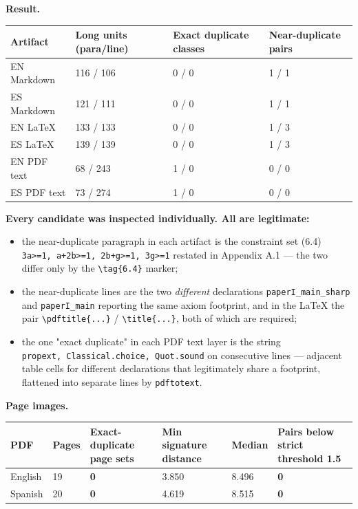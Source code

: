 \documentclass[
  9pt,
  a4paper,
]{article}
\newcounter{none} %
\providecommand{\tightlist}{%
  \setlength{\itemsep}{0pt}\setlength{\parskip}{0pt}}
\begin{document}
\textbf{Result.}

{\def\LTcaptype{none} %
\begin{longtable}[]{@{}llll@{}}
\toprule\noalign{}
Artifact & Long units (para/line) & Exact duplicate classes &
Near-duplicate pairs \\
\midrule\noalign{}
\endhead
\bottomrule\noalign{}
\endlastfoot
EN Markdown & 116 / 106 & 0 / 0 & 1 / 1 \\
ES Markdown & 121 / 111 & 0 / 0 & 1 / 1 \\
EN LaTeX & 133 / 133 & 0 / 0 & 1 / 3 \\
ES LaTeX & 139 / 139 & 0 / 0 & 1 / 3 \\
EN PDF text & 68 / 243 & 1 / 0 & 0 / 0 \\
ES PDF text & 73 / 274 & 1 / 0 & 0 / 0 \\
\end{longtable}
}

\textbf{Every candidate was inspected individually. All are legitimate:}

\begin{itemize}
\tightlist
\item
  the near-duplicate paragraph in each artifact is the constraint set
  (6.4)
  \texttt{3a\textgreater{}=1,\ a+2b\textgreater{}=1,\ 2b+g\textgreater{}=1,\ 3g\textgreater{}=1}
  restated in Appendix A.1 --- the two differ only by the
  \texttt{\textbackslash{}tag\{6.4\}} marker;
\item
  the near-duplicate lines are the two \emph{different} declarations
  \texttt{paperI\_main\_sharp} and \texttt{paperI\_main} reporting the
  same axiom footprint, and in the LaTeX the pair
  \texttt{\textbackslash{}pdftitle\{...\}} /
  \texttt{\textbackslash{}title\{...\}}, both of which are required;
\item
  the one "exact duplicate" in each PDF text layer is the string
  \texttt{propext,\ Classical.choice,\ Quot.sound} on consecutive lines
  --- adjacent table cells for different declarations that legitimately
  share a footprint, flattened into separate lines by
  \texttt{pdftotext}.
\end{itemize}

\textbf{Page images.}

{\def\LTcaptype{none} %
\begin{longtable}[]{@{}llllll@{}}
\toprule\noalign{}
PDF & Pages & Exact-duplicate page sets & Min signature distance &
Median & Pairs below strict threshold 1.5 \\
\midrule\noalign{}
\endhead
\bottomrule\noalign{}
\endlastfoot
English & 19 & \textbf{0} & 3.850 & 8.496 & \textbf{0} \\
Spanish & 20 & \textbf{0} & 4.619 & 8.515 & \textbf{0} \\
\end{longtable}
}
\end{document}

